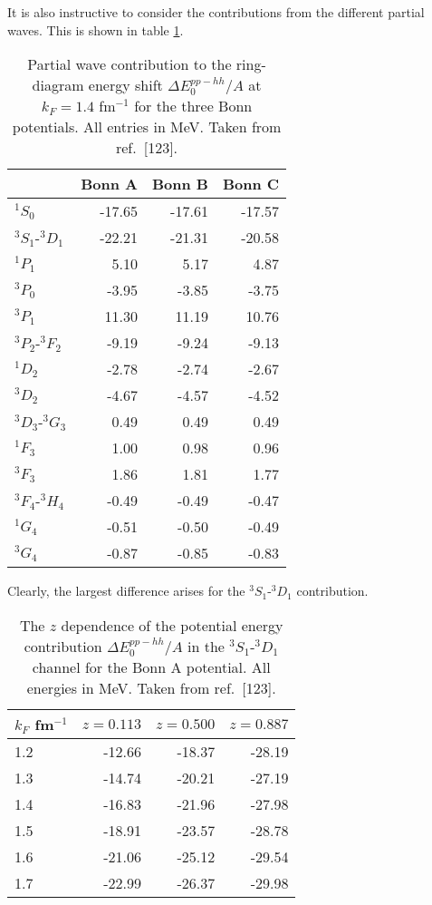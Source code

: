 It is also instructive to consider the contributions from the
different partial waves. This is shown in table \ref{tab:rings1}.
\begin{table}[hbtp]
\caption{Partial wave contribution to the ring-diagram
energy shift $\Delta E_0^{pp-hh}/A$ at $k_F=1.4$ fm$^{-1}$
for the three Bonn potentials. All entries in MeV. Taken from
ref.\ [123].}
\begin{center}
\begin{tabular}{lrrr}
\\\hline
&
\multicolumn{1}{c}{Bonn A}&
\multicolumn{1}{c}{Bonn B}&
\multicolumn{1}{c}{Bonn C}
\\ \hline
$^{1}S_0$&-17.65&-17.61&-17.57\\
$^{3}S_1$-$^{3}D_1$&-22.21&-21.31&-20.58\\
$^{1}P_1$&5.10&5.17&4.87\\
$^{3}P_0$&-3.95&-3.85&-3.75\\
$^{3}P_1$&11.30&11.19&10.76\\
$^{3}P_2$-$^{3}F_2$&-9.19&-9.24&-9.13\\
$^{1}D_2$&-2.78&-2.74&-2.67\\
$^{3}D_2$&-4.67&-4.57&-4.52\\
$^{3}D_3$-$^{3}G_3$&0.49&0.49&0.49\\
$^{1}F_3$&1.00&0.98&0.96\\
$^{3}F_3$&1.86&1.81&1.77\\
$^{3}F_4$-$^{3}H_4$&-0.49&-0.49&-0.47\\
$^{1}G_4$&-0.51&-0.50&-0.49\\
$^{3}G_4$&-0.87&-0.85&-0.83\\
\hline
\end{tabular}
\end{center}
\label{tab:rings1}
\end{table}
Clearly, the largest difference arises  for the 
$^3S_1$-$^3D_1$ contribution.
\begin{table}[hbtp]
\caption{The $z$ dependence of the potential energy
contribution
$\Delta E_0^{pp-hh}/A$ in the $^{3}S_1$-$^{3}D_1$ channel
for the Bonn A potential. All energies in MeV. Taken from
ref.\ [123].}
\begin{center}
\begin{tabular}{lrrr}
\\\hline
\multicolumn{1}{c}{$k_F$ fm$^{-1}$}&
\multicolumn{1}{c}{$z=0.113$}&
\multicolumn{1}{c}{$z=0.500$}&
\multicolumn{1}{c}{$z=0.887$}
\\ \hline
1.2&-12.66&-18.37&-28.19\\
1.3&-14.74&-20.21&-27.19\\
1.4&-16.83&-21.96&-27.98\\
1.5&-18.91&-23.57&-28.78\\
1.6&-21.06&-25.12&-29.54\\
1.7&-22.99&-26.37&-29.98\\
\hline
\end{tabular}
\end{center}
\label{tab:rings2}
\end{table}
